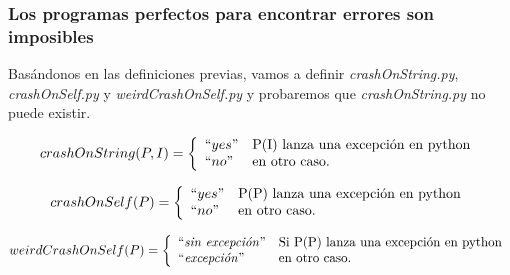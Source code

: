 \documentclass[xcolor=table]{beamer}
\begin{document}
\begin{frame} [fragile] \frametitle{Los programas perfectos para encontrar errores son imposibles}  \footnotesize  

Basándonos en las definiciones previas, vamos a definir \textit{crashOnString.py}, \textit{crashOnSelf.py} y  \textit{weirdCrashOnSelf.py} y probaremos que \textit{crashOnString.py} no puede existir. 


\begin{dmath}
     \label{eq:crashOnString}
     crashOnString(P, I) =  \left\{
	       \begin{array}{ll}
		 ``yes"      & \text{P(I) lanza una excepción en python} \\
		 ``no"     & \text{en otro caso.} \\
	       \end{array}
	     \right.
 \end{dmath}

\begin{dmath}
     \label{eq:crashOnSelf}
     crashOnSelf(P) =  \left\{
	       \begin{array}{ll}
		 ``yes"      & \text{P(P) lanza una excepción en python} \\
	``no"     & \text{en otro caso.} \\
	       \end{array}
	     \right.
 \end{dmath}

 \begin{dmath}
     \label{eq:weirdCrashOnSelf}
     weirdCrashOnSelf(P) =  \left\{
	       \begin{array}{ll}
		 ``\text{\textit{sin excepción}}"      &  \text{Si P(P) lanza una excepción en python} \\
	     ``\text{\textit{excepción}}"                    & \text{en otro caso.} \\
	       \end{array}
	     \right.
 \end{dmath}
\end{frame} 
\end{document}
